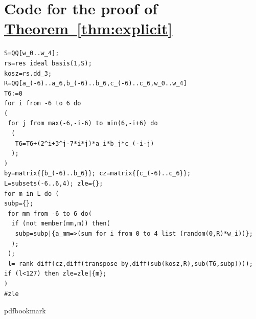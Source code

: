 \documentclass[11pt]{article}
\newcommand{\expref}[2]{\texorpdfstring{\hyperref[#2]{#1~\ref{#2}}}{#1~\ref{#2}}}
\begin{document}
 \section{Code for the proof of \expref{Theorem}{thm:explicit}}\label{codesect}
\begin{verbatim}
S=QQ[w_0..w_4];
rs=res ideal basis(1,S);
kosz=rs.dd_3;
R=QQ[a_(-6)..a_6,b_(-6)..b_6,c_(-6)..c_6,w_0..w_4] 
T6:=0
for i from -6 to 6 do
(
 for j from max(-6,-i-6) to min(6,-i+6) do
  ( 
   T6=T6+(2^i+3^j-7*i*j)*a_i*b_j*c_(-i-j)
  ); 
)
by=matrix{{b_(-6)..b_6}}; cz=matrix{{c_(-6)..c_6}};
L=subsets(-6..6,4); zle={};
for m in L do (
subp={};
 for mm from -6 to 6 do(
  if (not member(mm,m)) then(
   subp=subp|{a_mm=>(sum for i from 0 to 4 list (random(0,R)*w_i))};
  );
 );
 l= rank diff(cz,diff(transpose by,diff(sub(kosz,R),sub(T6,subp))));
if (l<127) then zle=zle|{m};
)
#zle
\end{verbatim}

\newcommand{\prelim}{Preliminary version in\ }\newcommand{\prelims}{Preliminary
  versions in\ }
\providecommand{\bibhead}[1]{}
\expandafter\ifx\csname pdfbookmark\endcsname\relax%
  \providecommand{\tocrefpdfbookmark}{}
\else\providecommand{\tocrefpdfbookmark}{%
   \hypertarget{tocreferences}{}%
   \pdfbookmark[1]{References}{tocreferences}}%
\fi
\end{document}
